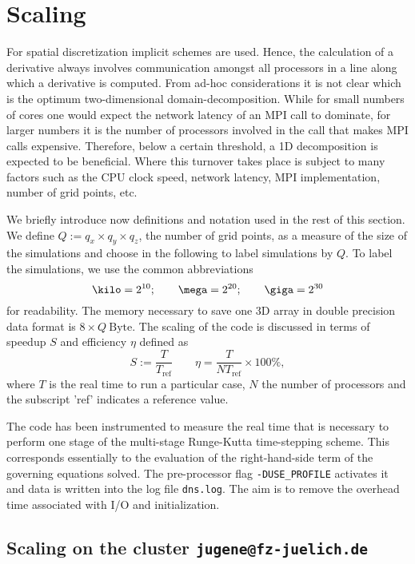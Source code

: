 \chapter{Scaling}\label{sec:scaling}

For spatial discretization implicit schemes are used. Hence, the calculation of
a derivative always involves communication amongst all processors in a line
along which a derivative is computed. From ad-hoc considerations it is not clear
which is the optimum two-dimensional domain-decomposition.  While for small
numbers of cores one would expect the network latency of an MPI call to
dominate, for larger numbers it is the number of processors involved in the call
that makes MPI calls expensive. Therefore, below a certain threshold, a 1D
decomposition is expected to be beneficial. Where this turnover takes place is
subject to many factors such as the CPU clock speed, network latency, MPI
implementation, number of grid points, etc.

We briefly introduce now definitions and notation used in the rest of this
section. We define $Q:=q_x\times q_y \times q_z$, the number of grid points, as
a measure of the size of the simulations and choose in the following to label
simulations by $Q$. To label the simulations, we use the common abbreviations
\begin{equation}
\kilo=2^{10};\qquad\mega=2^{20};\qquad\giga=2^{30}
\end{equation}
for readability. The memory necessary to save one 3D array in double precision
data format is $8\times Q~\mathrm{Byte}$.  The scaling of the code is discussed
in terms of speedup $S$ and efficiency $\eta$ defined as
\begin{equation}
 S:=\frac{T}{T_\mathrm{ref}}\qquad \eta = \frac{T}{NT_\mathrm{ref}} \times 100\%,
\end{equation}
where $T$ is the real time to run a particular case, $N$ the number of
processors and the subscript 'ref' indicates a reference value.

The code has been instrumented to measure the real time that is necessary to
perform one stage of the multi-stage Runge-Kutta time-stepping scheme.  This
corresponds essentially to the evaluation of the right-hand-side term of the
governing equations solved. The pre-processor flag \verb,-DUSE_PROFILE,
activates it and data is written into the log file \verb,dns.log,. The aim is to
remove the overhead time associated with I/O and initialization.

\section{Scaling on the cluster \texttt{jugene@fz-juelich.de}}

